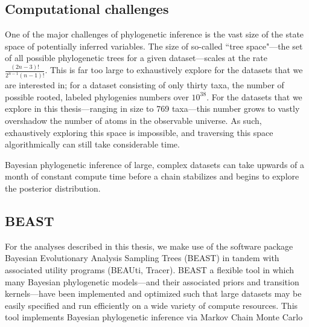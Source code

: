 
%

\subsection{Computational challenges}

One of the major challenges of phylogenetic inference is the vast size of the state space of potentially inferred variables.
The size of so-called ``tree space"---the set of all possible phylogenetic trees for a given dataset---scales at the rate $\frac{(2n-3)!}{2^{n-1}(n-1)!}$.
This is far too large to exhaustively explore for the datasets that we are interested in; for a dataset consisting of only thirty taxa, the number of possible rooted, labeled phylogenies numbers over $10^{38}$\cite{felsenstein2003inferring}.
For the datasets that we explore in this thesis---ranging in size to 769 taxa---this number grows to vastly overshadow the number of atoms in the observable universe.
As such, exhaustively exploring this space is impossible, and traversing this space algorithmically can still take considerable time.

Bayesian phylogenetic inference of large, complex datasets can take upwards of a month of constant compute time before a chain stabilizes and begins to explore the posterior distribution.

\subsection{BEAST}

For the analyses described in this thesis, we make use of the software package Bayesian Evolutionary Analysis Sampling Trees \cite{beast} (BEAST) in tandem with associated utility programs (BEAUti, Tracer).
BEAST a flexible tool in which many Bayesian phylogenetic models---and their associated priors and transition kernels---have been implemented and optimized such that large datasets may be easily specified and run efficiently on a wide variety of compute resources.
This tool implements Bayesian phylogenetic inference via Markov Chain Monte Carlo


\cleardoublepage


